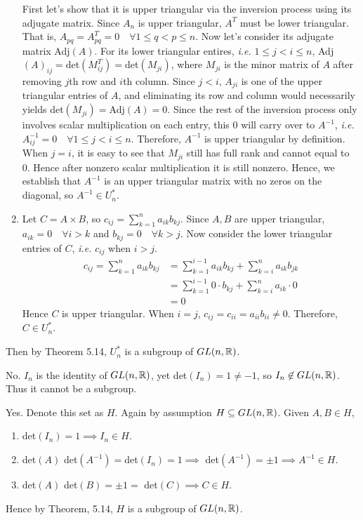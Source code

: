 \documentclass[12pt]{article}
\begin{document}
\begin{problem}[5.10]
\begin{enumerate}[label=(\roman*)]
			First let's show that it is upper triangular via the inversion process using its adjugate matrix. Since $A_n$ is upper triangular, $A^{T}$ must be lower triangular. That is, $A_{pq}=A^{T}_{pq} = 0 \quad \forall 1 \leq q < p \leq n$. Now let's consider its adjugate matrix Adj$(A)$. For its lower triangular entires, \emph{i.e.} $1\leq j<i\leq n$, Adj$(A)_{ij}=$det$(M^{T}_{ij})=$det$(M_{ji})$, where $M_{ji}$ is the minor matrix of $A$ after removing  $j$th row and  $i$th column. Since $j<i$,  $A_{ji}$ is one of the upper triangular entries of $A$, and eliminating its row and column would necessarily yields  det$(M_{ji})=$Adj$(A)=0$. Since the rest of the inversion process only involves scalar multiplication on each entry, this 0 will carry over to $A^{-1}$, \emph{i.e.} $A^{-1}_{ij}=0 \quad \forall 1\leq j<i\leq n$. Therefore, $A^{-1}$ is upper triangular by definition.  
			When $j=i$, it is easy to see that $M_{ji}$ still has full rank and cannot equal to 0. Hence after nonzero scalar multiplication it is still nonzero. Hence, we establish that $A^{-1}$ is an upper triangular matrix with no zeros on the diagonal, so $A^{-1} \in U_n^* $.
		\item Let $C=A \times B$, so $c_{ij}=\sum_{ k= 1}^{ n} a_{ik} b_{kj} $. Since $A,B$ are upper triangular,  $a_{ik}=0 \quad \forall i>k$ and $b_{kj}=0 \quad \forall k>j$. Now consider the lower triangular entries of $C$,  \emph{i.e.} $c_{ij}$ when $i>j$. 
			\begin{align*}
				c_{ij}=\sum_{ k= 1}^{ n} a_{ik}b_{kj} &= \sum_{ k= 1}^{ i-1} a_{ik}b_{kj} + \sum_{ k= i}^{ n} a_{ik}b_{jk}  \\
				&=  \sum_{ k= 1}^{ i-1} 0 \cdot b_{kj} + \sum_{ k= i}^{ n} a_{ik} \cdot 0 \\
				&= 0 
			\end{align*}
			Hence $C$ is upper triangular. When $i=j$, $c_{ij}=c_{ii} = a_{ii}b_{ii}\neq 0$. Therefore, $C \in U_n^* $. 
	\end{enumerate}
	Then by Theorem 5.14, $U_n^* $ is a subgroup of $GL(n, \mathbb{R})$.
\end{problem}

\begin{problem}[5.11]
	No. $I_n$ is the identity of $GL(n, \mathbb{R})$, yet det$(I_n)=1 \neq -1$, so $I_n \not\in GL(n, \mathbb{R})$. Thus it cannot be a subgroup.
\end{problem}

\begin{problem}[5.12]
	Yes. Denote this set as $H$. Again by assumption $H \subseteq GL(n, \mathbb{R})$. Given $A,B \in H$, 
	\begin{enumerate}[label=(\roman*)]
		\item det$(I_n)=1 \implies I_n \in H$.
		\item det$(A)$ det$(A^{-1}) =$det$(I_n) =1 \implies$ det$(A^{-1}) = \pm 1 \implies A^{-1} \in H$.
		\item det$(A)$ det$(B) = \pm 1 =$ det$(C) \implies C \in H$. 
	\end{enumerate}
	Hence by Theorem, 5.14,  $H$ is a subgroup of  $GL(n, \mathbb{R})$.
\end{problem}
\end{document}
